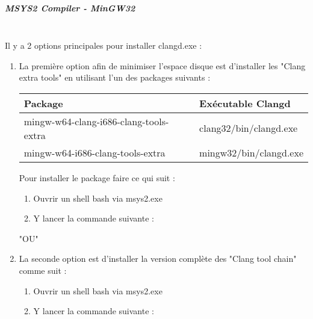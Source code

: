     \subparagraph*{MSYS2 Compiler - MinGW32} \hspace{0pt} \\
     Il y a 2 options principales pour installer clangd.exe :
     \begin{enumerate}[noitemsep]
     \item La première option afin de minimiser l'espace disque est d'installer les "Clang extra tools" en utilisant l'un des packages suivants :\\
        {\footnotesize
        \begin{longtable}{|l|l|}\hline
        \textbf{Package}                            & \textbf{Exécutable Clangd}    \\ \hline
        mingw-w64-clang-i686-clang-tools-extra      & clang32/bin/clangd.exe        \\
        mingw-w64-i686-clang-tools-extra            & mingw32/bin/clangd.exe        \\ \hline
        \end{longtable}
        \par}

        Pour installer le package faire ce qui suit :
        \begin{enumerate}[noitemsep]
        \item Ouvrir un shell bash via msys2.exe
        \item Y lancer la commande suivante : \newline
              \newline
        \end{enumerate}

        "OU" \newline

     \item La seconde option est d'installer la version complète des "Clang tool chain" comme suit :
        \begin{enumerate}[noitemsep]
        \item Ouvrir un shell bash via msys2.exe
        \item Y lancer la commande suivante : \newline
        \end{enumerate}
    \end{enumerate}

